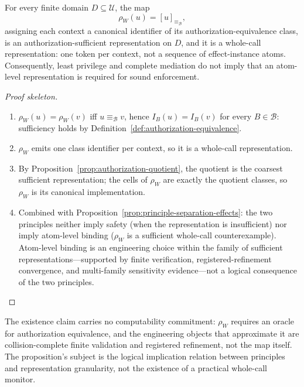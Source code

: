 \begin{proposition}
\label{prop:whole-call-sufficient}
For every finite domain $D\subseteq\mathcal{U}$, the map
\[
  \rho_W(u)=[u]_{\equiv_{\mathcal{B}}},
\]
assigning each context a canonical identifier of its
authorization-equivalence class, is an authorization-sufficient
representation on $D$, and it is a whole-call representation: one token per
context, not a sequence of effect-instance atoms. Consequently, least
privilege and complete mediation do not imply that an atom-level
representation is required for sound enforcement.
\end{proposition}

\begin{proof}[Proof skeleton]
\begin{enumerate}
  \item $\rho_W(u)=\rho_W(v)$ iff $u\equiv_{\mathcal{B}}v$, hence
        $I_B(u)=I_B(v)$ for every $B\in\mathcal{B}$: sufficiency holds by
        Definition~\ref{def:authorization-equivalence}.
  \item $\rho_W$ emits one class identifier per context, so it is a
        whole-call representation.
  \item By Proposition~\ref{prop:authorization-quotient}, the quotient is the
        coarsest sufficient representation; the cells of $\rho_W$ are exactly
        the quotient classes, so $\rho_W$ is its canonical implementation.
  \item Combined with Proposition~\ref{prop:principle-separation-effects}:
        the two principles neither imply safety (when the representation is
        insufficient) nor imply atom-level binding ($\rho_W$ is a sufficient
        whole-call counterexample). Atom-level binding is an engineering
        choice within the family of sufficient representations---supported by
        finite verification, registered-refinement convergence, and
        multi-family sensitivity evidence---not a logical consequence of the
        two principles. \qedhere
\end{enumerate}
\end{proof}

The existence claim carries no computability commitment: $\rho_W$ requires an
oracle for authorization equivalence, and the engineering objects that
approximate it are collision-complete finite validation and registered
refinement, not the map itself. The proposition's subject is the logical
implication relation between principles and representation granularity, not
the existence of a practical whole-call monitor.

